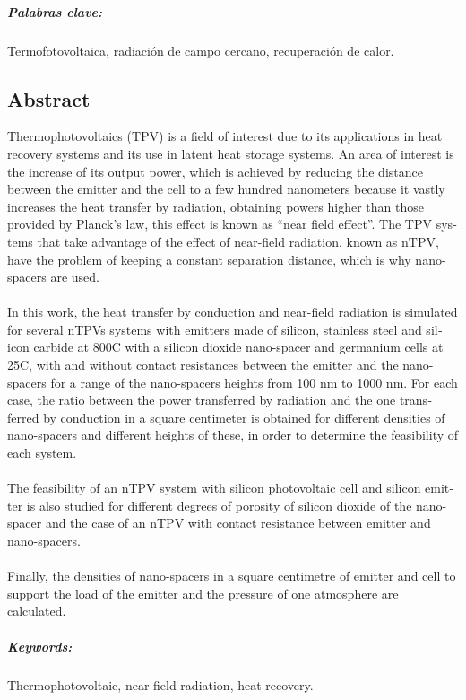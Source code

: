 
\paragraph{Palabras clave:} Termofotovoltaica, radiación de campo cercano, recuperación de calor.
\begin{otherlanguage}{british}
\chapter{Abstract}

Thermophotovoltaics (TPV) is a field of interest due to its applications in heat recovery systems and its use in latent heat storage systems. An area of interest is the increase of its output power, which is achieved by reducing the distance between the emitter and the cell to a few hundred nanometers because it vastly increases the heat transfer by radiation, obtaining powers higher than those provided by Planck's law, this effect is known as ``near field effect''. The TPV systems that take advantage of the effect of near-field radiation, known as nTPV, have the problem of keeping a constant separation distance, which is why nano-spacers are used.\\\\
%
In this work, the heat transfer by conduction and near-field radiation is simulated for several nTPVs systems with emitters made of silicon, stainless steel and silicon carbide at 800\textdegree C with a silicon dioxide nano-spacer and germanium cells at 25\textdegree C, with and without contact resistances between the emitter and the nano-spacers for a range of the nano-spacers heights from 100 nm to 1000 nm. For each case, the ratio between the power transferred by radiation and the one transferred by conduction in a square centimeter is obtained for different densities of nano-spacers and different heights of these, in order to determine the feasibility of each system.\\\\
%
The feasibility of an nTPV system with silicon photovoltaic cell and silicon emitter is also studied for different degrees of porosity of silicon dioxide of the nano-spacer and the case of an nTPV with contact resistance between emitter and nano-spacers.\\\\
%
Finally, the densities of nano-spacers in a square centimetre of emitter and cell to support the load of the emitter and the pressure of one atmosphere are calculated. %

\paragraph{Keywords:} Thermophotovoltaic, near-field radiation, heat recovery.
\end{otherlanguage}